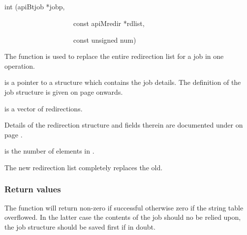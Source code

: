 \subsection{\funcnameXBputredirlist{}}

\begin{expara}

int \funcnameXBputredirlist{}(apiBtjob *jobp,

\ \ \ \ \ \ \ \ \ \ \ \ \ \ \ \ \ \ \ \ const apiMredir *rdlist,

\ \ \ \ \ \ \ \ \ \ \ \ \ \ \ \ \ \ \ \ const unsigned num)

\end{expara}

The function \funcXBputredirlist{} is used to replace
the entire redirection list for a job in one operation.

 is a pointer to a structure which contains
the job details. The definition of the job structure is given on page
\pageref{bkm:Jobstructure} onwards.

 is a vector of redirections.

Details of the redirection structure and fields therein are documented
under \funcXBgetredir{} on page
\pageref{bkm:redirstruct}.

 is the number of elements in
.

The new redirection list completely replaces the old.

\subsubsection{Return values}
The function will return non-zero if successful otherwise zero if the
string table overflowed. In the latter case the contents of the job
should no be relied upon, the job structure should be saved first if in
doubt.

